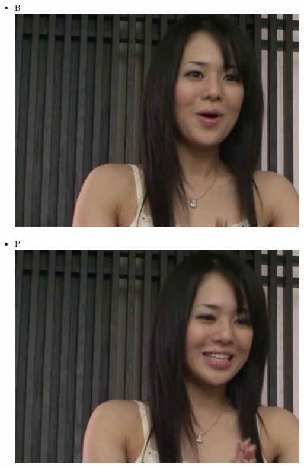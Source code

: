 \documentclass{beamer}
\begin{document}
\begin{frame}
\begin{itemize}
\item B\\
\includegraphics[scale=0.40]{fig/cjk3.jpg}
\end{itemize}
\end{frame}
\begin{frame}
\begin{itemize}
\item P\\
\includegraphics[scale=0.40]{fig/cjk4.jpg}
\end{itemize}
\end{frame}
\end{document}
